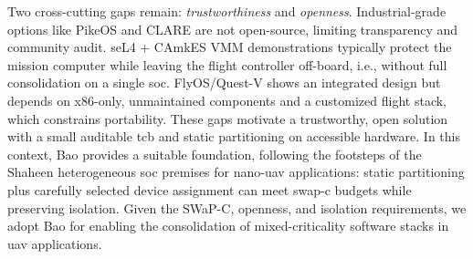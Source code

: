 Two cross-cutting gaps remain: \emph{trustworthiness} and \emph{openness}.
Industrial-grade options like PikeOS and CLARE are not open-source, limiting transparency and community audit.
seL4 + CAmkES VMM demonstrations typically protect the mission computer while leaving the flight controller off-board, i.e., without full consolidation on a single \gls{soc}.
FlyOS/Quest-V shows an integrated design but depends on x86-only, unmaintained components and a customized flight stack, which constrains portability.
These gaps motivate a trustworthy, open solution with a small auditable \gls{tcb} and static partitioning on accessible hardware.
In this context, Bao provides a suitable foundation, following the
footsteps of the Shaheen heterogeneous
\gls{soc}\cite{valente_heterogeneous_2024} premises for nano-\gls{uav}
applications: static partitioning plus carefully selected device assignment can
meet \gls{swap-c} budgets while preserving isolation.
Given the SWaP-C, openness, and isolation requirements, we adopt Bao for
enabling the consolidation of mixed-criticality software stacks in \gls{uav} applications.



